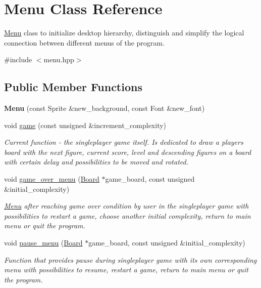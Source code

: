 \hypertarget{classMenu}{}\section{Menu Class Reference}
\label{classMenu}


\hyperlink{classMenu}{Menu} class to initialize desktop hierarchy, distinguish and simplify the logical connection between different menus of the program.  




{\ttfamily \#include $<$menu.\+hpp$>$}

\subsection*{Public Member Functions}
\begin{DoxyCompactItemize}
\item 
\mbox{\label{classMenu_a9c43bee337cc6e447feaf336ca6a42c6}} 
{\bfseries Menu} (const Sprite \&new\+\_\+background, const Font \&new\+\_\+font)
\item 
void \hyperlink{classMenu_a99a23768dd7c2069fd638aab42776b25}{game} (const unsigned \&increment\+\_\+complexity)
\begin{DoxyCompactList}\small\item\em Current function -\/ the singleplayer game itself. Is dedicated to draw a player\textquotesingle{}s board with the next figure, current score, level and descending figures on a board with certain delay and possibilities to be moved and rotated. \end{DoxyCompactList}\item 
void \hyperlink{classMenu_a85c7bd501d83ee524742ea546e0211d6}{game\+\_\+over\+\_\+menu} (\hyperlink{classBoard}{Board} $\ast$game\+\_\+board, const unsigned \&initial\+\_\+complexity)
\begin{DoxyCompactList}\small\item\em \hyperlink{classMenu}{Menu} after reaching game over condition by user in the singleplayer game with possibilities to restart a game, choose another initial complexity, return to main menu or quit the program. \end{DoxyCompactList}\item 
void \hyperlink{classMenu_a565dd91e5669c0ed6d5344af85b6ff0f}{pause\+\_\+menu} (\hyperlink{classBoard}{Board} $\ast$game\+\_\+board, const unsigned \&initial\+\_\+complexity)
\begin{DoxyCompactList}\small\item\em Function that provides pause during singleplayer game with its own corresponding menu with possibilities to resume, restart a game, return to main menu or quit the program. \end{DoxyCompactList}\item 

\end{DoxyCompactItemize}

